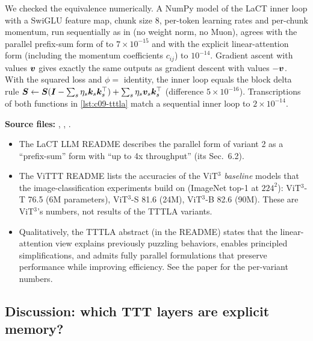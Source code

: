 We checked the equivalence numerically. A NumPy model of the LaCT inner loop with a SwiGLU
feature map, chunk size 8, per-token learning rates and per-chunk momentum, run sequentially as
in  (no weight norm, no Muon), agrees with the parallel prefix-sum form of
 to $7\times10^{-15}$ and with the explicit linear-attention form
(including the momentum coefficients $c_{ij}$) to $10^{-14}$. Gradient ascent with values $\bm{v}$
gives exactly the same outputs as gradient descent with values $-\bm{v}$. With the squared loss and
$\phi = $ identity, the inner loop equals the block delta rule
$\bm{S} \gets \bm{S}(\bm{I} - \sum_s\eta_s\bm{k}_s\bm{k}_s^{\top}) + \sum_s\eta_s\bm{v}_s\bm{k}_s^{\top}$ (difference
$5\times10^{-16}$). Transcriptions of both functions in \cref{lst:c09-tttla} match a sequential
inner loop to $2\times10^{-14}$.

\begin{results}
\textbf{Source files:} ,
,
.
\begin{itemize}
  \item The LaCT LLM README describes the parallel form of variant 2 as a ``prefix-sum'' form
        with ``up to 4x throughput'' (its Sec.~6.2).
  \item The ViTTT README lists the accuracies of the ViT$^3$ \emph{baseline} models that the
        image-classification experiments build on (ImageNet top-1 at $224^2$): ViT$^3$-T 76.5
        (6M parameters), ViT$^3$-S 81.6 (24M), ViT$^3$-B 82.6 (90M). These are ViT$^3$'s numbers,
        not results of the TTTLA variants.
  \item Qualitatively, the TTTLA abstract (in the README) states that the linear-attention view
        explains previously puzzling behaviors, enables principled simplifications, and admits
        fully parallel formulations that preserve performance while improving efficiency. See the
        paper for the per-variant numbers.
\end{itemize}
\end{results}

\subsection{Discussion: which TTT layers are explicit memory?}


